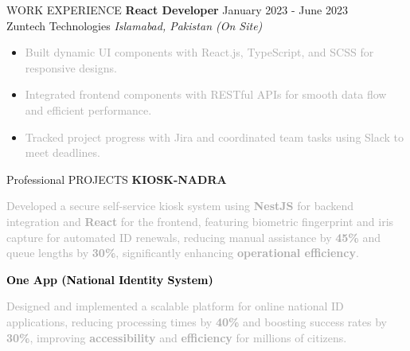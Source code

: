 \documentclass{resume} %
\begin{document}
\begin{rSection}{WORK EXPERIENCE}
 \small \textbf{React Developer} \hfill January 2023 - June 2023\\
Zuntech Technologies \hfill \textit{Islamabad, Pakistan (On Site)}
\begin{itemize}
    \itemsep -3pt {} 
    \item \textcolor{darkgray}{Built dynamic UI components with React.js, TypeScript, and SCSS for responsive designs.}
    \item \textcolor{darkgray}{Integrated frontend components with RESTful APIs for smooth data flow and efficient performance.}
    \item \textcolor{darkgray}{Tracked project progress with Jira and coordinated team tasks using Slack to meet deadlines.}
\end{itemize}

\end{rSection} 


\begin{rSection}{Professional PROJECTS}
\vspace{0.5em}
\small \textbf{KIOSK-NADRA} \raggedright \textcolor{darkgray}{Developed a secure self-service kiosk system using \textbf{NestJS} for backend integration and \textbf{React} for the frontend, featuring biometric fingerprint and iris capture for automated ID renewals, reducing manual assistance by \textbf{45\%} and queue lengths by \textbf{30\%}, significantly enhancing \textbf{operational efficiency}.}

\small \textbf{\textcolor{black}{One App (National Identity System)}} \raggedright \textcolor{darkgray}{Designed and implemented a scalable platform for online national ID applications, reducing processing times by \textbf{40\%} and boosting success rates by \textbf{30\%}, improving \textbf{accessibility} and \textbf{efficiency} for millions of citizens.}





\end{rSection}
\end{document}
